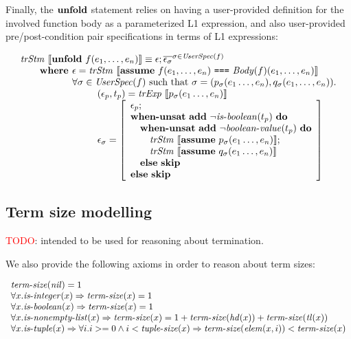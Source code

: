 Finally, the $\textbf{unfold}$ statement relies on having a user-provided definition
for the involved function body as a parameterized L1 expression, and also 
user-provided pre/post-condition pair specifications in terms of L1 expressions:

\[
\begin{array}{l}
\trStm{\unfoldE~f(e_1, \dots, e_n)} \equiv \epsilon;\overline{\epsilon_\sigma}^{\sigma \in \UserSpec{f}}\\
\qquad \textbf{where } \epsilon = \trStm{\assumeE~f(e_1, \dots, e_n)~\texttt{===}~\Body{f}(e_1, \dots, e_n)}\\
\qquad \phantom{\textbf{where }} \forall \sigma \in \UserSpec{f} \textrm{ such that } \sigma = (p_\sigma(e_1\ldots,e_n), q_\sigma(e_1, \ldots, e_n)).\\
\qquad\qquad\qquad\qquad (\epsilon_p, t_p) = \trExps{p_\sigma(e_1\ldots,e_n)}\\
\qquad\qquad\qquad\qquad \epsilon_\sigma = \left[ 
\begin{array}{l}
\epsilon_p;\\
\whenUnsatW~\addE~\neg\isboolean{t_p}~\doW\\
\quad\whenUnsatW~\addE~\neg\booleanvalue{t_p}~\doW\\
\quad\quad\trStm{\assumeE~p_\sigma(e_1\ldots,e_n)};\\
\quad\quad\trStm{\assumeE~q_\sigma(e_1\ldots,e_n)}\\
\quad\elseW~\skipE\\
\elseW~\skipE
\end{array}
\right] \\
\end{array}
\]

\subsection{Term size modelling}

\textcolor{red}{TODO}: intended to be used for reasoning about termination.

We also provide the following axioms in order to reason about
term sizes:

\[
\begin{array}{l}
\mathit{term\mbox{-}size}(\mathit{nil}) = 1\\
\forall x. \mathit{is\mbox{-}integer}(x) \Rightarrow \mathit{term\mbox{-}size}(x) = 1\\
\forall x. \mathit{is\mbox{-}boolean}(x) \Rightarrow \mathit{term\mbox{-}size}(x) = 1\\
\forall x. \mathit{is\mbox{-}nonempty\mbox{-}list}(x) \Rightarrow \mathit{term\mbox{-}size}(x) = 1 + \mathit{term\mbox{-}size}(\mathit{hd}(x)) + \mathit{term\mbox{-}size}(\mathit{tl}(x))\\
\forall x. \mathit{is\mbox{-}tuple}(x) \Rightarrow \forall i. i >= 0 \wedge i < \mathit{tuple\mbox{-}size}(x) \Rightarrow \mathit{term\mbox{-}size}(\mathit{elem}(x, i)) < \mathit{term\mbox{-}size}(x)\\
\end{array}
\]

